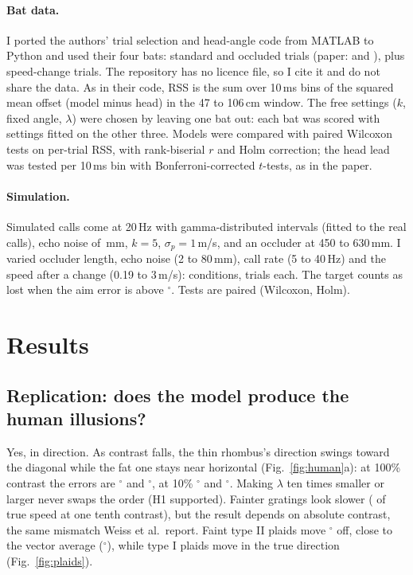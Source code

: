 \documentclass[11pt]{article}
\begin{document}
\paragraph{Bat data.} I ported the authors' trial selection and head-angle code from MATLAB \cite{sallesrepo} to Python and used their four bats: \realNBL{} standard and \realNOL{} occluded trials (paper: \paperNBL{} and \paperNOL), plus speed-change trials. The repository has no licence file, so I cite it and do not share the data. As in their code, RSS is the sum over 10\,ms bins of the squared mean offset (model minus head) in the 47 to 106\,cm window. The free settings ($k$, fixed angle, $\lambda$) were chosen by leaving one bat out: each bat was scored with settings fitted on the other three. Models were compared with paired Wilcoxon tests on per-trial RSS, with rank-biserial $r$ and Holm correction; the head lead was tested per 10\,ms bin with Bonferroni-corrected $t$-tests, as in the paper.

\paragraph{Simulation.} Simulated calls come at 20\,Hz with gamma-distributed intervals (fitted to the real calls), echo noise of \simBaseNoiseMm\,mm, $k=5$, $\sigma_p=1$\,m/s, and an occluder at 450 to 630\,mm. I varied occluder length, echo noise (2 to 80\,mm), call rate (5 to 40\,Hz) and the speed after a change (0.19 to 3\,m/s): \simNCells{} conditions, \simNTrialsPerCell{} trials each. The target counts as lost when the aim error is above \simTolDeg$^\circ$. Tests are paired (Wilcoxon, Holm).

\section{Results}
\subsection{Replication: does the model produce the human illusions?}
Yes, in direction. As contrast falls, the thin rhombus's direction swings toward the diagonal while the fat one stays near horizontal (Fig.~\ref{fig:human}a): at 100\% contrast the errors are \humanThinHighErr$^\circ$ and \humanFatHighErr$^\circ$, at 10\% \humanThinLowErr$^\circ$ and \humanFatLowErr$^\circ$. Making $\lambda$ ten times smaller or larger never swaps the order (H1 supported). Fainter gratings look slower (\humanGratingRelSpeedFortyAtTenth{} of true speed at one tenth contrast), but the result depends on absolute contrast, the same mismatch Weiss et al.\ report. Faint type II plaids move \humanPlaidTwoLowDir$^\circ$ off, close to the vector average (\humanPlaidTwoVA$^\circ$), while type I plaids move in the true direction (Fig.~\ref{fig:plaids}).
\end{document}
